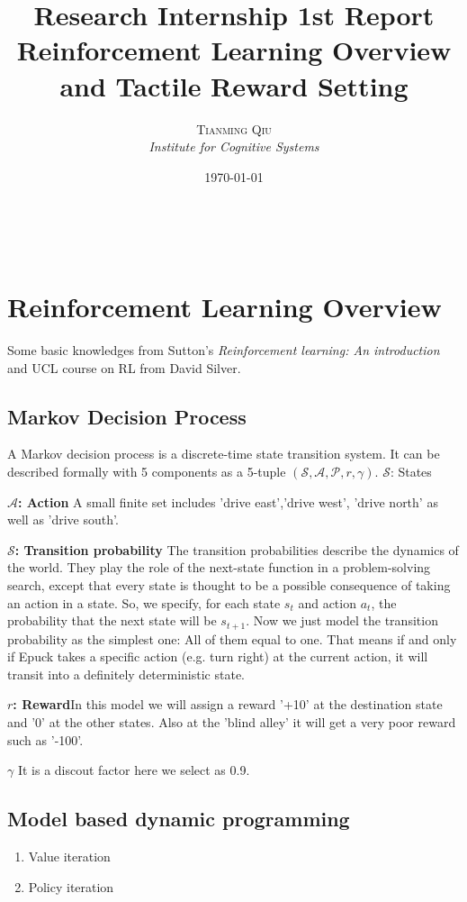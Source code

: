 \documentclass[a4paper, 11pt]{article} %
\title{\textbf{Research Internship 1st Report}\\ %
Reinforcement Learning Overview \\and Tactile Reward Setting} %
\author{\textsc{Tianming Qiu} %
\\{\textit{Institute for Cognitive Systems}}} %
\date{\today} %
\makeatletter
\renewcommand{\maketitle}{ %
\begin{flushright} %
{\LARGE\@title} %

\vspace{50pt} %

{\large\@author} %
\\\@date %

\vspace{40pt} %
\end{flushright}
}
\makeatother
\begin{document}
\maketitle %


\section{Reinforcement Learning Overview} 
Some basic knowledges from Sutton's \textit{Reinforcement learning: An introduction}\cite {sutton1998reinforcement} and UCL course on RL from David Silver. 

\subsection{Markov Decision Process}
A Markov decision process is a discrete-time state transition system. It can be described formally with 5 components as a 5-tuple $(\mathcal{S,A,P}, r,\gamma)$. $\mathcal{S}$: States

\textbf{$\mathcal{A}$: Action}\quad 
A small finite set includes 'drive east','drive west', 'drive north' as well as 'drive south'.

\textbf{$\mathcal{S}$: Transition probability}\quad 
The transition probabilities describe the dynamics of the world. They play the role of the next-state function in a problem-solving search, except that every state is thought to be a possible consequence of taking an action in a state. So, we specify, for each state $s_{t}$ and action $a_{t}$, the probability that the next state will be $s_{t+1}$. 
Now we just model the transition probability as the simplest one: All of them equal to one. That means if and only if Epuck takes a specific action (e.g. turn right) at the current action, it will transit into a definitely deterministic state.

\textbf{$r$: Reward}\quad  In this model we will assign a reward '+10' at the destination state and '0' at the other states. 
Also at the 'blind alley' it will get a very poor reward such as '-100'.

\textbf{$\gamma$}  \quad It is a discout factor here we select as 0.9.
\subsection{Model based dynamic programming}
\begin{enumerate}
\item Value iteration
\item Policy iteration
\end{enumerate}
\end{document}
